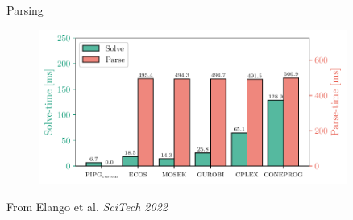 \documentclass[aspectratio=169]{beamer}
\begin{document}
\begin{frame}{Parsing}
    \begin{figure}
        \includegraphics[width=0.90\textwidth]{img/bar_lqr_N30.pdf}
    \end{figure}

\vspace{0.25cm} 

{\footnotesize \color{gray} From Elango et al. \emph{SciTech 2022}}    
\end{frame}
\end{document}
